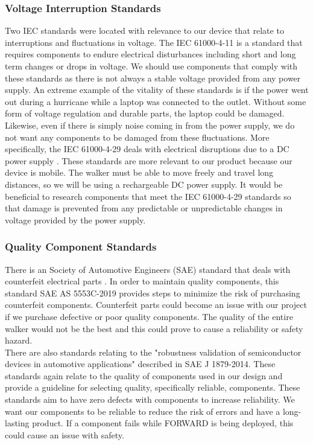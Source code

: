 \subsubsection{Voltage Interruption Standards}
\noindent Two IEC standards were located with relevance to our device that relate to interruptions and fluctuations in voltage. The IEC 61000-4-11\cite{iec_standard_2} is a standard that requires components to endure electrical disturbances including short and long term changes or drops in voltage. We should use components that comply with these standards as there is not always a stable voltage provided from any power supply. An extreme example of the vitality of these standards is if the power went out during a hurricane while a laptop was connected to the outlet. Without some form of voltage regulation and durable parts, the laptop could be damaged. Likewise, even if there is simply noise coming in from the power supply, we do not want any components to be damaged from these fluctuations. More specifically, the IEC 61000-4-29 deals with electrical disruptions due to a DC power supply \cite{iec_standard_3}. These standards are more relevant to our product because our device is mobile. The walker must be able to move freely and travel long distances, so we will be using a rechargeable DC power supply. It would be beneficial to research components that meet the IEC 61000-4-29 standards so that damage is prevented from any predictable or unpredictable changes in voltage provided by the power supply.

\subsubsection{Quality Component Standards}
\noindent There is an Society of Automotive Engineers (SAE) standard that deals with counterfeit electrical parts \cite{sae5553c2019}. In order to maintain quality components, this standard SAE AS 5553C-2019 provides steps to minimize the risk of purchasing counterfeit components. Counterfeit parts could become an issue with our project if we purchase defective or poor quality components. The quality of the entire walker would not be the best and this could prove to cause a reliability or safety hazard.\\

\noindent There are also standards relating to the "robustness validation of semiconductor devices in automotive applications" described in SAE J 1879-2014. These standards again relate to the quality of components used in our design and provide a guideline for selecting quality, specifically reliable, components. These standards aim to have zero defects with components to increase reliability. We want our components to be reliable to reduce the risk of errors and have a long-lasting product. If a component fails while FORWARD is being deployed, this could cause an issue with safety.\cite{sae18792014}

